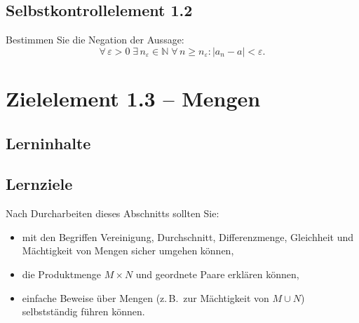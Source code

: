 \documentclass[a4paper,12pt]{article}
\begin{document}
\subsection*{Selbstkontrollelement 1.2}

Bestimmen Sie die Negation der Aussage:
\[
  \forall\,\varepsilon > 0 \; \exists\,n_\varepsilon \in \mathbb{N} \;
  \forall\,n \geq n_\varepsilon : |a_n - a| < \varepsilon.
\]

\newpage

\section*{Zielelement 1.3 -- Mengen}

\subsection*{Lerninhalte}

\begin{center}
\end{center}

\subsection*{Lernziele}

Nach Durcharbeiten dieses Abschnitts sollten Sie:
\begin{itemize}
  \item mit den Begriffen Vereinigung, Durchschnitt, Differenzmenge, Gleichheit
        und Mächtigkeit von Mengen sicher umgehen können,
  \item die Produktmenge $M \times N$ und geordnete Paare erklären können,
  \item einfache Beweise über Mengen (z.\,B.\ zur Mächtigkeit von $M \cup N$)
        selbstständig führen können.
\end{itemize}
\end{document}
